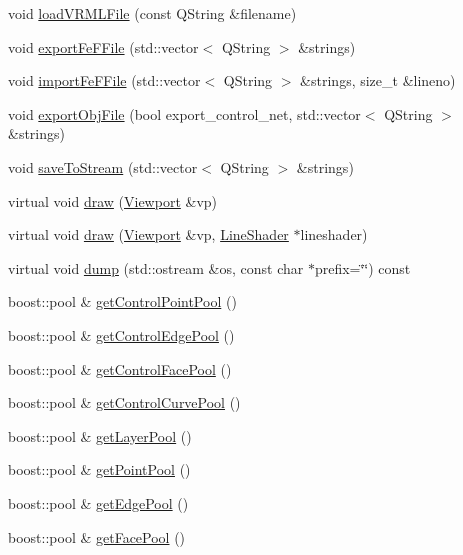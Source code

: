 \begin{DoxyCompactItemize}
void \hyperlink{classShipCAD_1_1SubdivisionSurface_add8d612c82f170869f81042520f62499}{load\-V\-R\-M\-L\-File} (const Q\-String \&filename)
\item 
void \hyperlink{classShipCAD_1_1SubdivisionSurface_a958a2af5d8d06ccf1aa3ac4e812cb1be}{export\-Fe\-F\-File} (std\-::vector$<$ Q\-String $>$ \&strings)
\item 
void \hyperlink{classShipCAD_1_1SubdivisionSurface_af5e99c578032b83916f5c06591cbf459}{import\-Fe\-F\-File} (std\-::vector$<$ Q\-String $>$ \&strings, size\-\_\-t \&lineno)
\item 
void \hyperlink{classShipCAD_1_1SubdivisionSurface_ac6a4c0542b17b1b50edb57ea5c0f28ec}{export\-Obj\-File} (bool export\-\_\-control\-\_\-net, std\-::vector$<$ Q\-String $>$ \&strings)
\item 
void \hyperlink{classShipCAD_1_1SubdivisionSurface_a51d2d07423cc53fc98012f07ed9525bc}{save\-To\-Stream} (std\-::vector$<$ Q\-String $>$ \&strings)
\item 
virtual void \hyperlink{classShipCAD_1_1SubdivisionSurface_acfe9cc964dbe05105486b43f2dc6fc4f}{draw} (\hyperlink{classShipCAD_1_1Viewport}{Viewport} \&vp)
\item 
virtual void \hyperlink{classShipCAD_1_1SubdivisionSurface_ab1c250ff9fa7acae3ecdca4575f3e259}{draw} (\hyperlink{classShipCAD_1_1Viewport}{Viewport} \&vp, \hyperlink{classShipCAD_1_1LineShader}{Line\-Shader} $\ast$lineshader)
\item 
virtual void \hyperlink{classShipCAD_1_1SubdivisionSurface_a6ed961bbb7ca5fe94ec5566109d9b015}{dump} (std\-::ostream \&os, const char $\ast$prefix=\char`\"{}\char`\"{}) const 
\item 
boost\-::pool \& \hyperlink{classShipCAD_1_1SubdivisionSurface_a49109b80a26f29ad52ac109574cf4d5a}{get\-Control\-Point\-Pool} ()
\item 
boost\-::pool \& \hyperlink{classShipCAD_1_1SubdivisionSurface_aa9ed4c00847b5c04f99b27f754df481b}{get\-Control\-Edge\-Pool} ()
\item 
boost\-::pool \& \hyperlink{classShipCAD_1_1SubdivisionSurface_ab9199097e998971add79f7dccbd262c3}{get\-Control\-Face\-Pool} ()
\item 
boost\-::pool \& \hyperlink{classShipCAD_1_1SubdivisionSurface_a647c0e4a20cfd823cc578431c2799c04}{get\-Control\-Curve\-Pool} ()
\item 
boost\-::pool \& \hyperlink{classShipCAD_1_1SubdivisionSurface_a7e80bac4f91557a620fc1843f77b9953}{get\-Layer\-Pool} ()
\item 
boost\-::pool \& \hyperlink{classShipCAD_1_1SubdivisionSurface_a8a8dbbc32fcdc5a08c462cd86c224649}{get\-Point\-Pool} ()
\item 
boost\-::pool \& \hyperlink{classShipCAD_1_1SubdivisionSurface_a2bffb2bf9575d934e18ed5087f8d2996}{get\-Edge\-Pool} ()
\item 
boost\-::pool \& \hyperlink{classShipCAD_1_1SubdivisionSurface_a3fcdae8e54e98938de00dfa4229d8aa8}{get\-Face\-Pool} ()
\end{DoxyCompactItemize}

